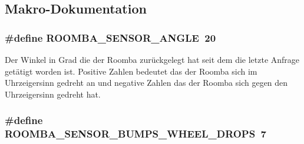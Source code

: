 \subsection{Makro-\/\-Dokumentation}
\hypertarget{group__roomba__sensor__extern_ga274b9e8c77f7e8cd8dde6e3626aa817c}{
\subsubsection[{R\-O\-O\-M\-B\-A\-\_\-\-S\-E\-N\-S\-O\-R\-\_\-\-A\-N\-G\-L\-E}]{\setlength{\rightskip}{0pt plus 5cm}\#define R\-O\-O\-M\-B\-A\-\_\-\-S\-E\-N\-S\-O\-R\-\_\-\-A\-N\-G\-L\-E~20}}\label{group__roomba__sensor__extern_ga274b9e8c77f7e8cd8dde6e3626aa817c}
Der Winkel in Grad die der Roomba zurückgelegt hat seit dem die letzte Anfrage getätigt worden ist. Positive Zahlen bedeutet das der Roomba sich im Uhrzeigersinn gedreht an und negative Zahlen das der Roomba sich gegen den Uhrzeigersinn gedreht hat. \hypertarget{group__roomba__sensor__extern_ga52d4985b7063d9a96315c241657620a3}{
\subsubsection[{R\-O\-O\-M\-B\-A\-\_\-\-S\-E\-N\-S\-O\-R\-\_\-\-B\-U\-M\-P\-S\-\_\-\-W\-H\-E\-E\-L\-\_\-\-D\-R\-O\-P\-S}]{\setlength{\rightskip}{0pt plus 5cm}\#define R\-O\-O\-M\-B\-A\-\_\-\-S\-E\-N\-S\-O\-R\-\_\-\-B\-U\-M\-P\-S\-\_\-\-W\-H\-E\-E\-L\-\_\-\-D\-R\-O\-P\-S~7}}\label{group__roomba__sensor__extern_ga52d4985b7063d9a96315c241657620a3}
